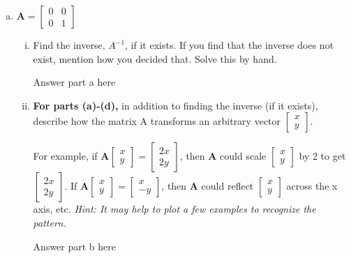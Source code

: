 \documentclass[11pt]{article}
\def\A{\textbf{A}} %
\begin{document}
\begin{enumerate}
\begin{enumerate}[(a)]
	      		      		               
	      		      		                    
	      	\newpage
	      	\item $\A = \begin{bmatrix}
	      	      0 & 0 \\
	      	      0 & 1
	      	\end{bmatrix}$
	      		      		
	      	\begin{enumerate}[i.]
	      		\item Find the inverse, $A^{-1}$, if it exists. If you find that the inverse does not exist, mention how you decided that. Solve this by hand.
	      		      \begin{Answer}
	      		      	Answer part a here
	      		      \end{Answer}
	      		\item \textbf{For parts (a)-(d),} in addition to finding the inverse (if it exists), describe how the matrix A transforms an arbitrary vector $\begin{bmatrix}
	      		      x \\
	      		      y
	      		\end{bmatrix}$.
	      			      		                    
	      		For example, if $\A \begin{bmatrix}
	      		x \\
	      		y
	      		\end{bmatrix} = \begin{bmatrix}
	      		2x \\
	      		2y
	      		\end{bmatrix}$, then $\A$ could scale $\begin{bmatrix}
	      		x \\
	      		y
	      		\end{bmatrix}$ by 2 to get $\begin{bmatrix}
	      		2x \\
	      		2y
	      		\end{bmatrix}$. If $\A \begin{bmatrix}
	      		x \\
	      		y
	      		\end{bmatrix}
	      		=
	      		\begin{bmatrix}
	      			x  \\
	      			-y 
	      		\end{bmatrix}$, then $\A$ could reflect $\begin{bmatrix}
	      		x \\
	      		y
	      		\end{bmatrix}$ across the x axis, etc. \textit{Hint: It may help to plot a few examples to recognize the pattern.}
	      		\begin{Answer}
	      			Answer part b here
	      		\end{Answer}
	      	\end{enumerate}
	      	

\end{enumerate}
\end{enumerate}
\end{document}
